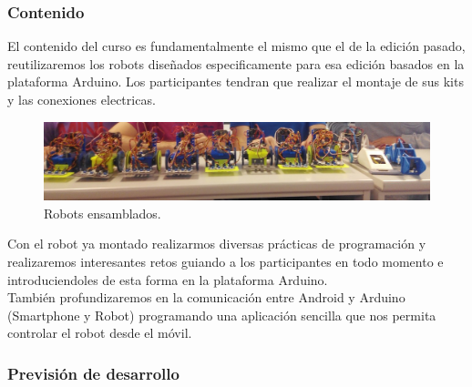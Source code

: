 \documentclass[12pt,twoside]{report}
\begin{document}
\subsubsection{Contenido}
El contenido del curso es fundamentalmente el mismo que el de la edición pasado, reutilizaremos los robots diseñados especificamente para esa edición basados en la plataforma Arduino. Los participantes tendran que realizar el montaje de sus kits y las conexiones electricas. \\
\begin{figure}[hbtp]
\centerline{\includegraphics[width=1\linewidth]{fotos/robots_ArduParty.jpg}}
\caption*{
Robots ensamblados.
}
\end{figure}
Con el robot ya montado realizarmos diversas prácticas de programación y realizaremos interesantes retos guiando a los participantes en todo momento e introduciendoles de esta forma en la plataforma Arduino.\\
También profundizaremos en la comunicación entre Android y Arduino (Smartphone y Robot) programando una aplicación sencilla que nos permita controlar el robot desde el móvil.
\subsubsection{Previsión de desarrollo}
\end{document}
